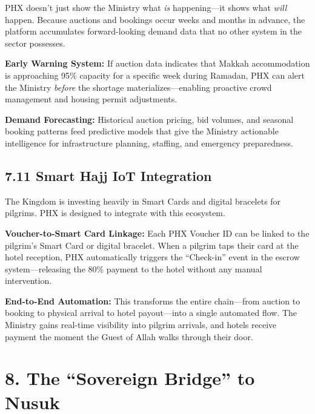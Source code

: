\documentclass[11pt,a4paper]{article}
\begin{document}
PHX doesn't just show the Ministry what \textit{is} happening---it shows what \textit{will} happen. Because auctions and bookings occur weeks and months in advance, the platform accumulates forward-looking demand data that no other system in the sector possesses.

\vspace{0.3cm}

\textbf{Early Warning System:} If auction data indicates that Makkah accommodation is approaching 95\% capacity for a specific week during Ramadan, PHX can alert the Ministry \textit{before} the shortage materializes---enabling proactive crowd management and housing permit adjustments.

\vspace{0.3cm}

\textbf{Demand Forecasting:} Historical auction pricing, bid volumes, and seasonal booking patterns feed predictive models that give the Ministry actionable intelligence for infrastructure planning, staffing, and emergency preparedness.

\subsection*{7.11 Smart Hajj IoT Integration}

The Kingdom is investing heavily in Smart Cards and digital bracelets for pilgrims. PHX is designed to integrate with this ecosystem.

\vspace{0.3cm}

\textbf{Voucher-to-Smart Card Linkage:} Each PHX Voucher ID can be linked to the pilgrim's Smart Card or digital bracelet. When a pilgrim taps their card at the hotel reception, PHX automatically triggers the ``Check-in'' event in the escrow system---releasing the 80\% payment to the hotel without any manual intervention.

\vspace{0.3cm}

\textbf{End-to-End Automation:} This transforms the entire chain---from auction to booking to physical arrival to hotel payout---into a single automated flow. The Ministry gains real-time visibility into pilgrim arrivals, and hotels receive payment the moment the Guest of Allah walks through their door.

\section*{8. The ``Sovereign Bridge'' to Nusuk}
\end{document}
